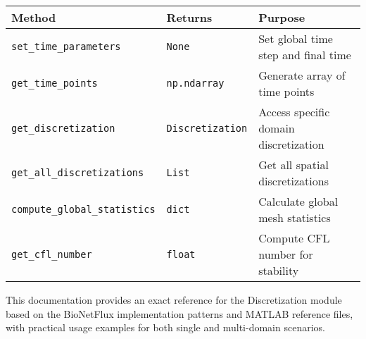 \begin{longtable}{|p{4cm}|p{2cm}|p{7cm}|}
\hline
\textbf{Method} & \textbf{Returns} & \textbf{Purpose} \\
\hline
\endhead

\texttt{set\_time\_parameters} & \texttt{None} & Set global time step and final time \\
\hline

\texttt{get\_time\_points} & \texttt{np.ndarray} & Generate array of time points \\
\hline

\texttt{get\_discretization} & \texttt{Discretization} & Access specific domain discretization \\
\hline

\texttt{get\_all\_discretizations} & \texttt{List} & Get all spatial discretizations \\
\hline

\texttt{compute\_global\_statistics} & \texttt{dict} & Calculate global mesh statistics \\
\hline

\texttt{get\_cfl\_number} & \texttt{float} & Compute CFL number for stability \\
\hline

\end{longtable}

This documentation provides an exact reference for the Discretization module based on the BioNetFlux implementation patterns and MATLAB reference files, with practical usage examples for both single and multi-domain scenarios.

